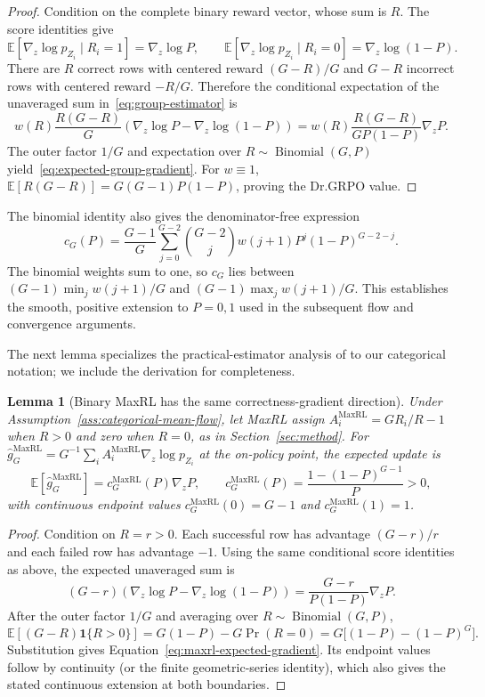 \documentclass{article}
\newcommand{\enforcehalffinalproseline}{%
  \setlength{\parfillskip}{0pt plus .20\linewidth}}
\newcommand{\1}{\mathbf 1}
\newcommand{\E}{\mathbb E}
\newtheorem{lemma}{Lemma}[section]
\theoremstyle{remark}
\theoremstyle{definition}
\theoremstyle{plain}
\begin{document}
\begin{proof}
\enforcehalffinalproseline
Condition on the complete binary reward vector, whose sum is $R$. The score
identities give
\[
  \E[\nabla_z\log p_{Z_i}\mid R_i=1]=\nabla_z\log P,
  \qquad
  \E[\nabla_z\log p_{Z_i}\mid R_i=0]
  =\nabla_z\log(1-P).
\]
There are $R$ correct rows with centered reward $(G-R)/G$ and $G-R$
incorrect rows with centered reward $-R/G$. Therefore the conditional
expectation of the unaveraged sum in~\eqref{eq:group-estimator} is
\[
  w(R)\frac{R(G-R)}{G}
  \left(\nabla_z\log P-\nabla_z\log(1-P)\right)
  =w(R)\frac{R(G-R)}{GP(1-P)}\nabla_zP.
\]
The outer factor $1/G$ and expectation over
$R\sim\operatorname{Binomial}(G,P)$ yield~\eqref{eq:expected-group-gradient}.
For $w\equiv1$,
$\E[R(G-R)]=G(G-1)P(1-P)$, proving the Dr.GRPO value.
\end{proof}

The binomial identity also gives the denominator-free expression
\[
 c_G(P)=\frac{G-1}{G}\sum_{j=0}^{G-2}\binom{G-2}{j}
 w(j+1)P^j(1-P)^{G-2-j}.
\]
The binomial weights sum to one, so $c_G$ lies between
$(G-1)\min_j w(j+1)/G$ and $(G-1)\max_j w(j+1)/G$.
This establishes the smooth, positive extension to $P=0,1$ used in the
subsequent flow and convergence arguments.

The next lemma specializes the practical-estimator analysis of
\citet[Section~4.3 and App.~D, Theorem~5]{tajwar2026maxrl}
to our categorical notation; we include the derivation for completeness.

\begin{lemma}[Binary MaxRL has the same correctness-gradient direction]
\enforcehalffinalproseline
\label{lem:maxrl-mean}
Under Assumption~\ref{ass:categorical-mean-flow}, let MaxRL assign
$A_i^{\mathrm{MaxRL}}=GR_i/R-1$ when $R>0$ and zero when $R=0$, as in
Section~\ref{sec:method}. For
$\widehat g_G^{\mathrm{MaxRL}}=G^{-1}\sum_i
 A_i^{\mathrm{MaxRL}}\nabla_z\log p_{Z_i}$ at the on-policy point, the
expected update is
\begin{equation}
  \E[\widehat g_G^{\mathrm{MaxRL}}]
  =c_G^{\mathrm{MaxRL}}(P)\nabla_zP,
  \qquad
  c_G^{\mathrm{MaxRL}}(P)
  =\frac{1-(1-P)^{G-1}}{P}>0,
  \label{eq:maxrl-expected-gradient}
\end{equation}
with continuous endpoint values
$c_G^{\mathrm{MaxRL}}(0)=G-1$ and
$c_G^{\mathrm{MaxRL}}(1)=1$.
\end{lemma}

\begin{proof}
\enforcehalffinalproseline
Condition on $R=r>0$. Each successful row has advantage $(G-r)/r$ and each
failed row has advantage $-1$. Using the same conditional score identities as
above, the expected unaveraged sum is
\[
  (G-r)\!\left(\nabla_z\log P-\nabla_z\log(1-P)\right)
  =\frac{G-r}{P(1-P)}\nabla_zP.
\]
After the outer factor $1/G$ and averaging over
$R\sim\operatorname{Binomial}(G,P)$,
\[
 \E[(G-R)\1\{R>0\}]
 =G(1-P)-G\Pr(R=0)
 =G\big[(1-P)-(1-P)^G\big].
\]
Substitution gives Equation~\eqref{eq:maxrl-expected-gradient}. Its endpoint
values follow by continuity (or the finite geometric-series identity), which
also gives the stated continuous extension at both boundaries.
\end{proof}
\end{document}
